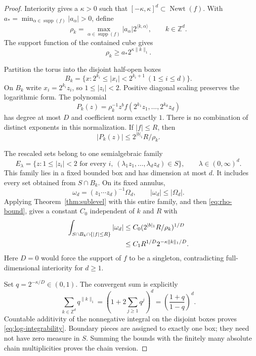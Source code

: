 \documentclass[11pt]{article}
\numberwithin{equation}{section}
\theoremstyle{definition}
\theoremstyle{remark}
\newcommand{\Z}{\mathbb Z}
\newcommand{\Newt}{\operatorname{Newt}}
\newcommand{\supp}{\operatorname{supp}}
\newcommand{\OmegaD}{\Omega_d}
\newcommand{\omegaD}{\omega_d}
\newcommand{\pair}[2]{\langle #1,#2\rangle}
\begin{document}
\begin{proof}
Interiority gives a $\kappa>0$ such that
$[-\kappa,\kappa]^d\subset\Newt(f)$. With
$a_* =\min_{\alpha\in\supp(f)}|a_\alpha|>0$, define
\[
 \rho_k=\max_{\alpha\in\supp(f)}|a_\alpha|2^{\pair{k}{\alpha}},
 \qquad k\in\Z^d.
\]
The support function of the contained cube gives
\begin{equation}\label{eq:rho-bound}
 \rho_k\ge a_*2^{\kappa\|k\|_1}.
\end{equation}

Partition the torus into the disjoint half-open boxes
\[
 B_k=\{x:2^{k_i}\le|x_i|<2^{k_i+1}\ (1\le i\le d)\}.
\]
On $B_k$ write $x_i=2^{k_i}z_i$, so $1\le|z_i|<2$.
Positive diagonal scaling preserves the logarithmic form. The polynomial
\[
 P_k(z)=\rho_k^{-1}z^b f(2^{k_1}z_1,\ldots,2^{k_d}z_d)
\]
has degree at most $D$ and coefficient norm exactly $1$. There is no
combination of distinct exponents in this normalization. If $|f|\le R$,
then
\begin{equation}\label{eq:scaled-sublevel}
 |P_k(z)|\le 2^{|b|_1}R/\rho_k.
\end{equation}

The rescaled sets belong to one semialgebraic family
\[
 E_\lambda=\{z:1\le|z_i|<2\text{ for every }i,
               \ (\lambda_1z_1,\ldots,\lambda_dz_d)\in S\},
 \qquad \lambda\in(0,\infty)^d.
\]
This family lies in a fixed bounded box and has dimension at most $d$.
It includes every set obtained from $S\cap B_k$. On its fixed annulus,
\[
 \omegaD=(z_1\cdots z_d)^{-1}\OmegaD,
 \qquad |\omegaD|\le|\OmegaD|.
\]
Applying Theorem~\ref{thm:sublevel} with this entire family, and then
\eqref{eq:rho-bound}, gives a constant $C_0$ independent of $k$ and $R$
with
\begin{align}
 \int_{S\cap B_k\cap\{|f|\le R\}}|\omegaD|
 &\le C_0(2^{|b|_1}R/\rho_k)^{1/D}\notag\\
 &\le C_1R^{1/D}2^{-\kappa\|k\|_1/D}.
 \label{eq:dyadic-bound}
\end{align}
Here $D=0$ would force the support of $f$ to be a singleton, contradicting
full-dimensional interiority for $d\ge1$.

Set $q=2^{-\kappa/D}\in(0,1)$. The convergent sum is explicitly
\[
 \sum_{k\in\Z^d}q^{\|k\|_1}
 =\left(1+2\sum_{j\ge1}q^j\right)^d
 =\left(\frac{1+q}{1-q}\right)^d.
\]
Countable additivity of the nonnegative integral on the disjoint boxes
proves \eqref{eq:log-integrability}. Boundary pieces are assigned to
exactly one box; they need not have zero measure in $S$. Summing the
bounds with the finitely many absolute chain multiplicities proves the
chain version.
\end{proof}
\end{document}
